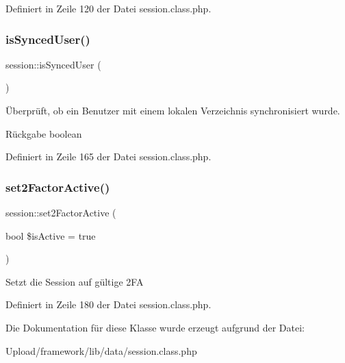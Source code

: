 Definiert in Zeile 120 der Datei session.\+class.\+php.

\mbox{\label{classsession_aa72d6eb0d49822e9836f8084f5b4dcd8}} 
\subsubsection{\texorpdfstring{is\+Synced\+User()}{isSyncedUser()}}
{\footnotesize\ttfamily session\+::is\+Synced\+User (\begin{DoxyParamCaption}{ }\end{DoxyParamCaption})}

Überprüft, ob ein Benutzer mit einem lokalen Verzeichnis synchronisiert wurde. \begin{DoxyReturn}{Rückgabe}
boolean 
\end{DoxyReturn}


Definiert in Zeile 165 der Datei session.\+class.\+php.

\mbox{\label{classsession_ab37f77b882b53f87e456ab99dcffe15c}} 
\subsubsection{\texorpdfstring{set2\+Factor\+Active()}{set2FactorActive()}}
{\footnotesize\ttfamily session\+::set2\+Factor\+Active (\begin{DoxyParamCaption}\item[{bool}]{\$is\+Active = {\ttfamily true} }\end{DoxyParamCaption})}

Setzt die Session auf gültige 2\+FA 

Definiert in Zeile 180 der Datei session.\+class.\+php.



Die Dokumentation für diese Klasse wurde erzeugt aufgrund der Datei\+:\begin{DoxyCompactItemize}
\item 
Upload/framework/lib/data/session.\+class.\+php\end{DoxyCompactItemize}
